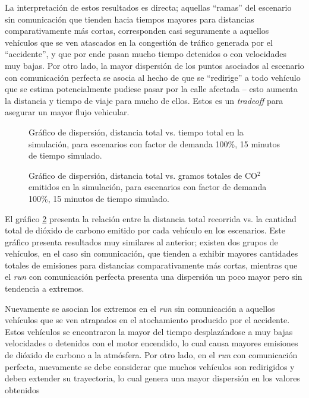 La interpretación de estos resultados es directa; aquellas ``ramas'' del escenario sin comunicación que tienden hacia tiempos mayores para distancias comparativamente más cortas, corresponden casi seguramente a aquellos vehículos que se ven atascados en la congestión de tráfico generada por el ``accidente'', y que por ende pasan mucho tiempo detenidos o con velocidades muy bajas. Por otro lado, la mayor dispersión de los puntos asociados al escenario con comunicación perfecta se asocia al hecho de que se ``redirige'' a todo vehículo que se estima potencialmente pudiese pasar por la calle afectada -- esto aumenta la distancia y tiempo de viaje para mucho de ellos. Estos es un \emph{tradeoff} para asegurar un mayor flujo vehicular.

\begin{figure}[tpb]
    \centering
    
    \caption[Distancia vs. tiempo total]{Gráfico de dispersión, distancia total vs. tiempo total en la simulación, para escenarios con factor de demanda 100\%, 15 minutos de tiempo simulado.}
    \label{fig:distvstime}
\end{figure}

\begin{figure}[tpb]
    \centering
    
    \caption[Distancia vs. CO$^{2}$ total]{Gráfico de dispersión, distancia total vs. gramos totales de CO$^{2}$ emitidos en la simulación, para escenarios con factor de demanda 100\%, 15 minutos de tiempo simulado.}
    \label{fig:distvsco2}
\end{figure}

El gráfico \ref{fig:distvsco2} presenta la relación entre la distancia total recorrida vs. la cantidad total de dióxido de carbono emitido por cada vehículo en los escenarios. Este gráfico presenta resultados muy similares al anterior; existen dos grupos de vehículos, en el caso sin comunicación, que tienden a exhibir mayores cantidades totales de emisiones para distancias comparativamente más cortas, mientras que el \emph{run} con comunicación perfecta presenta una dispersión un poco mayor pero sin tendencia a extremos.

Nuevamente se asocian los extremos en el \emph{run} sin comunicación a aquellos vehículos que se ven atrapados en el atochamiento producido por el accidente. Estos vehículos se encontraron la mayor del tiempo desplazándose a muy bajas velocidades o detenidos con el motor encendido, lo cual causa mayores emisiones de dióxido de carbono a la atmósfera. Por otro lado, en el \emph{run} con comunicación perfecta, nuevamente se debe considerar que muchos vehículos son redirigidos y deben extender su trayectoria, lo cual genera una mayor dispersión en los valores obtenidos

